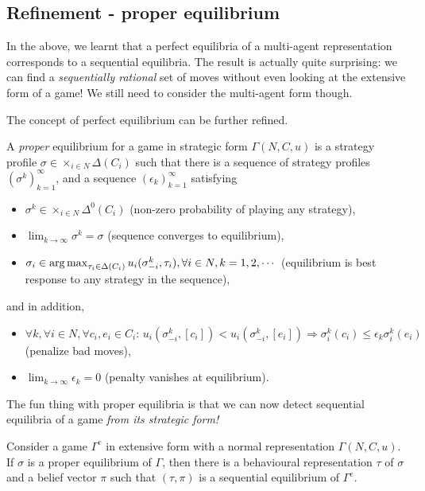 \subsection{Refinement - proper equilibrium}

In the above, we learnt that a perfect equilibria of a multi-agent representation corresponds to a sequential equilibria. The result is actually quite surprising: we can find a \emph{sequentially rational} set of moves without even looking at the extensive form of a game! We still need to consider the multi-agent form though.

The concept of perfect equilibrium can be further refined.
\begin{definition}
A \emph{proper} equilibrium for a game in strategic form $\Gamma(N,C,u)$ is a strategy profile $\sigma \in \times_{i \in N} \Delta (C_i)$ such that there is a sequence of strategy profiles $ (\sigma^k)_{k = 1}^\infty$, and a sequence $(\epsilon_k)_{k = 1}^{\infty}$ satisfying
\begin{itemize}
\item $\sigma^k \in \times_{i \in N} \Delta^0 (C_i)$ (non-zero probability of playing any strategy),
\item $\lim_{k \rightarrow \infty} \sigma^k = \sigma$ (sequence converges to equilibrium),
\item $ \sigma_i \in \operatorname*{arg\,max}_{\tau_i \in \Delta(C_i)}u_i(\sigma^k_{-i}, \tau_i), \forall i \in N, k = 1,2, \cdots $ (equilibrium is best response to any strategy in the sequence),
\end{itemize}
and in addition,
\begin{itemize}
\item $\forall k, \forall i \in N, \forall c_i, e_i \in C_i: \, u_i(\sigma_{-i}^k, [c_i]) < u_i(\sigma_{-i}^k, [e_i]) \Rightarrow \sigma^k_i(c_i) \le \epsilon_k \sigma^k_i(e_i)$ (penalize bad moves),
\item $\lim_{k \rightarrow \infty} \epsilon_k = 0$ (penalty vanishes at equilibrium).
\end{itemize}
\label{ch5:def:properEq}
\end{definition}

The fun thing with proper equilibria is that we can now detect sequential equilibria of a game \emph{from its strategic form!}

\begin{theorem}
Consider a game $\Gamma^e$ in extensive form with a normal representation $\Gamma(N,C,u)$.
If $\sigma$ is a proper equilibrium of $\Gamma$, then there is a behavioural representation $\tau$ of $\sigma$ and a belief vector $\pi$ such that $(\tau, \pi)$ is a sequential equilibrium of $\Gamma^e$.
\end{theorem}

